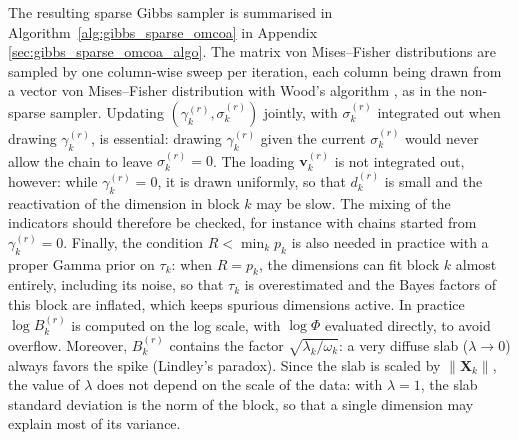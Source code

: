 \documentclass[11pt]{article}
\newcommand{\X}{\mathbf{X}}
\newcommand{\vv}{\mathbf{v}}
\begin{document}
\noindent The resulting sparse Gibbs sampler is summarised in Algorithm~\ref{alg:gibbs_sparse_omcoa} in Appendix \ref{sec:gibbs_sparse_omcoa_algo}. The matrix von Mises--Fisher distributions are sampled by one column-wise sweep per iteration, each column being drawn from a vector von Mises--Fisher distribution with Wood's algorithm \citep{wood1994}, as in the non-sparse sampler. Updating $(\gamma_k^{(r)},\sigma_k^{(r)})$ jointly, with $\sigma_k^{(r)}$ integrated out when drawing $\gamma_k^{(r)}$, is essential:
drawing $\gamma_k^{(r)}$ given the current $\sigma_k^{(r)}$ would never allow the chain to leave $\sigma_k^{(r)}=0$. The loading $\vv_k^{(r)}$ is not integrated out, however: while $\gamma_k^{(r)}=0$, it is drawn uniformly, so that $d_k^{(r)}$ is small and the reactivation of the dimension in block $k$ may be slow. The mixing of the indicators should therefore be checked, for instance with chains started from $\gamma_k^{(r)}=0$. Finally, the condition $R<\min_kp_k$ is also needed in practice with a proper Gamma prior on $\tau_k$: when $R=p_k$, the dimensions can fit block $k$ almost entirely, including its noise, so that $\tau_k$ is overestimated and the Bayes factors of this block are inflated, which keeps spurious dimensions active.
In practice $\log B_k^{(r)}$ is computed on the log scale, with $\log\Phi$ evaluated directly, to avoid overflow. Moreover, $B_k^{(r)}$ contains the factor $\sqrt{\lambda_k/\omega_k}$: a very diffuse slab ($\lambda\to0$) always favors the spike (Lindley's paradox). Since the slab is scaled by $\|\X_k\|$, the value of $\lambda$ does not depend on the scale of the data: with $\lambda=1$, the slab standard deviation is the norm of the block, so that a single dimension may explain most of its variance.
\end{document}
